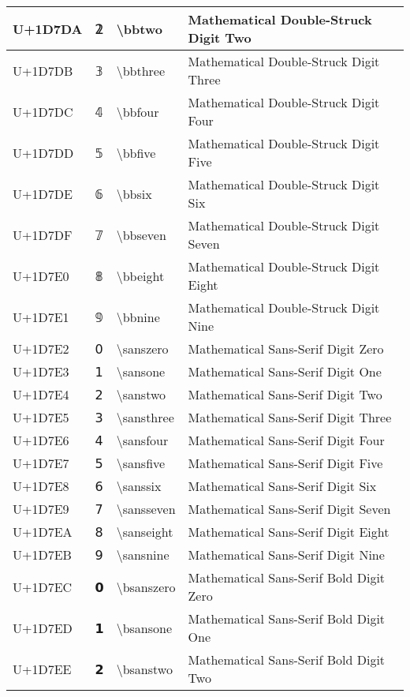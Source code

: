 \begin{table}[h]
\begin{tabulary}{\linewidth}{|L|L|L|L|}
\hline
U+1D7DA & 𝟚 & {\textbackslash}bbtwo & Mathematical Double-Struck Digit Two \\
\hline
U+1D7DB & 𝟛 & {\textbackslash}bbthree & Mathematical Double-Struck Digit Three \\
\hline
U+1D7DC & 𝟜 & {\textbackslash}bbfour & Mathematical Double-Struck Digit Four \\
\hline
U+1D7DD & 𝟝 & {\textbackslash}bbfive & Mathematical Double-Struck Digit Five \\
\hline
U+1D7DE & 𝟞 & {\textbackslash}bbsix & Mathematical Double-Struck Digit Six \\
\hline
U+1D7DF & 𝟟 & {\textbackslash}bbseven & Mathematical Double-Struck Digit Seven \\
\hline
U+1D7E0 & 𝟠 & {\textbackslash}bbeight & Mathematical Double-Struck Digit Eight \\
\hline
U+1D7E1 & 𝟡 & {\textbackslash}bbnine & Mathematical Double-Struck Digit Nine \\
\hline
U+1D7E2 & 𝟢 & {\textbackslash}sanszero & Mathematical Sans-Serif Digit Zero \\
\hline
U+1D7E3 & 𝟣 & {\textbackslash}sansone & Mathematical Sans-Serif Digit One \\
\hline
U+1D7E4 & 𝟤 & {\textbackslash}sanstwo & Mathematical Sans-Serif Digit Two \\
\hline
U+1D7E5 & 𝟥 & {\textbackslash}sansthree & Mathematical Sans-Serif Digit Three \\
\hline
U+1D7E6 & 𝟦 & {\textbackslash}sansfour & Mathematical Sans-Serif Digit Four \\
\hline
U+1D7E7 & 𝟧 & {\textbackslash}sansfive & Mathematical Sans-Serif Digit Five \\
\hline
U+1D7E8 & 𝟨 & {\textbackslash}sanssix & Mathematical Sans-Serif Digit Six \\
\hline
U+1D7E9 & 𝟩 & {\textbackslash}sansseven & Mathematical Sans-Serif Digit Seven \\
\hline
U+1D7EA & 𝟪 & {\textbackslash}sanseight & Mathematical Sans-Serif Digit Eight \\
\hline
U+1D7EB & 𝟫 & {\textbackslash}sansnine & Mathematical Sans-Serif Digit Nine \\
\hline
U+1D7EC & 𝟬 & {\textbackslash}bsanszero & Mathematical Sans-Serif Bold Digit Zero \\
\hline
U+1D7ED & 𝟭 & {\textbackslash}bsansone & Mathematical Sans-Serif Bold Digit One \\
\hline
U+1D7EE & 𝟮 & {\textbackslash}bsanstwo & Mathematical Sans-Serif Bold Digit Two \\

\end{tabulary}
\end{table}
